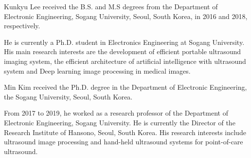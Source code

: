 \begin{IEEEbiography}{Kunkyu Lee}
received the B.S. and M.S degrees from the Department of Electronic Engineering, Sogang University, Seoul, South Korea, in 2016 and 2018, respectively.

He is currently a Ph.D. student in Electronics Engineering at Sogang University.
His main research interests are the development of efficient portable ultrasound imaging system, the efficient architecture of artificial intelligence with ultrasound system and Deep learning image processing in medical images.
\end{IEEEbiography}
\vspace{-0.3in}

\begin{IEEEbiography}{Min Kim} received the Ph.D. degree in the Department of Electronic Engineering, the Sogang University, Seoul, South Korea. 

From 2017 to 2019, he worked as a research professor of the Department of Electronic Engineering, Sogang University. 
He is currently the Director of the Research Institute of Hansono, Seoul, South Korea. 
His research interests include ultrasound image processing and hand-held ultrasound systems for point-of-care ultrasound.
\end{IEEEbiography}
\vspace{-0.3in}

